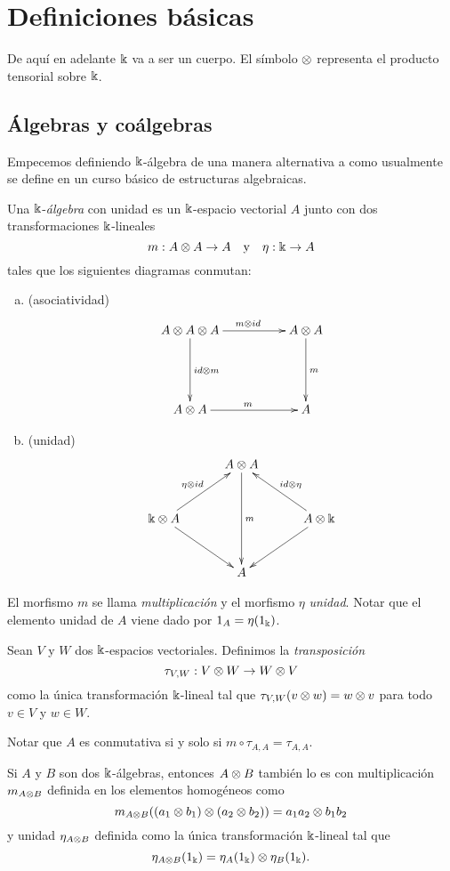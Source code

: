 \documentclass[a4paper,oneside,fleqn,11pt,../tesis.tex]{subfiles}
\begin{document}
\section{Definiciones básicas}
De aquí en adelante $\Bbbk$ va a ser un cuerpo. El símbolo $\otimes$ representa el producto tensorial
sobre $\Bbbk$.

\subsection{Álgebras y coálgebras}

Empecemos definiendo $\Bbbk$-álgebra de una manera alternativa a como usualmente se define en un
curso básico de estructuras algebraicas.

\begin{definition}\label{defalgebra} Una $\Bbbk$-\emph{álgebra} con unidad es un $\Bbbk$-espacio vectorial $A$ junto con dos
transformaciones $\Bbbk$-lineales
\[
	m: A \otimes A \to A \quad\text{y}\quad \eta: \Bbbk \to A
\]
tales que los siguientes diagramas conmutan:
\begin{enumerate}[(a)]
\item (asociatividad)
\begin{align*}
\xymatrix@=5em{
	A \ox A \ox A \ar[r]^{m \ox id} \ar[d]^{id \ox m} & A \ox A \ar[d]^{m} \\
	A \ox A \ar[r]^{m} & A
}
\end{align*}
\item (unidad)
\begin{align*}
\xymatrix@=3em{
	& A \ox A \ar[dd]^{m} & \\
	\field \ox A \ar[ur]^{\eta \ox id} \ar[dr] & & A \ox \field \ar[ul]_{id \ox \eta} \ar[dl] \\
	& A &
}
\end{align*}
\end{enumerate}
El morfismo $m$ se llama \emph{multiplicación} y el morfismo $\eta$ \emph{unidad}. 
Notar que el elemento unidad de $A$ viene dado por $1_{A} = \eta(1_{\Bbbk})$.
\end{definition}

\begin{definition}
	Sean $V$ y $W$ dos $\Bbbk$-espacios vectoriales. Definimos la \emph{transposición}
	\[
		\tau_{V,W}: V \otimes W \to W \otimes V
	\]
	como la única transformación $\Bbbk$-lineal tal que
	$\tau_{V,W}(v \otimes w) = w \otimes v$ para todo $v \in V$ y $w \in W$.
\end{definition}

Notar que $A$ es conmutativa si y solo si $m \circ \tau_{A, A} = \tau_{A, A}$.
\begin{obs}
	Si $A$ y $B$ son dos $\Bbbk$-álgebras, entonces $A \otimes B$
	también lo es con multiplicación $m_{A \otimes B}$ definida en los elementos homogéneos como
	\[
		m_{A \otimes B} ((a_1 \otimes b_1) \otimes (a_2 \otimes b_2)) = a_1 a_2 \otimes b_1 b_2
	\]
	y unidad $\eta_{A \otimes B}$ definida como la única transformación $\Bbbk$-lineal tal que
	\[
		\eta_{A \otimes B}(1_{\Bbbk}) = \eta_A(1_{\Bbbk}) \otimes \eta_B(1_{\Bbbk}).
	\]
\end{obs}
\end{document}
